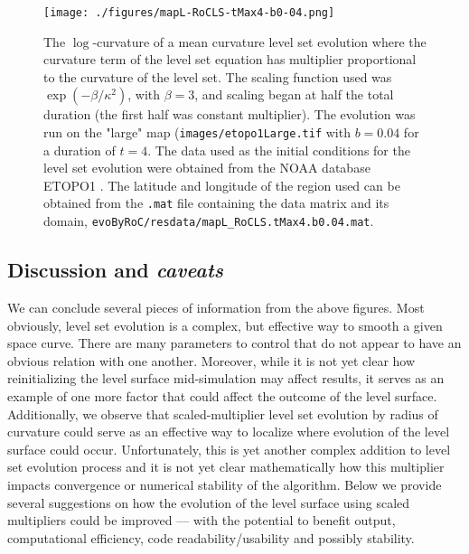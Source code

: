 \documentclass{article}
\begin{document}
\begin{figure}[h]
  \centering
  \texttt{[image: ./figures/mapL-RoCLS-tMax4-b0-04.png]}
  \caption{The $\log$-curvature of a mean curvature level set
    evolution where the curvature term of the level set equation
    has multiplier proportional to the curvature of the level
    set. The scaling function used was $\exp (-\beta/\kappa^2)$,
    with $\beta = 3$, and scaling began at half the total duration
    (the first half was constant multiplier). The evolution was
    run on the "large" map (\texttt{images/etopo1Large.tif} with
    $b = 0.04$ for a duration of $t = 4$. The data used as the
    initial conditions for the level set evolution were obtained
    from the NOAA database ETOPO1 \cite{etopo1}. The latitude and
    longitude of the region used can be obtained from the
    \texttt{.mat} file containing the data matrix and its domain,
    \texttt{evoByRoC/resdata/mapL\_RoCLS.tMax4.b0.04.mat}.}
\label{fig:scal-log-curv-3}
\end{figure}

\subsection{Discussion and \emph{caveats}}
\label{sec:emphcaveats}

We can conclude several pieces of information from the above
figures. Most obviously, level set evolution is a complex, but
effective way to smooth a given space curve. There are many
parameters to control that do not appear to have an obvious
relation with one another. Moreover, while it is not yet clear how
reinitializing the level surface mid-simulation may affect
results, it serves as an example of one more factor that could
affect the outcome of the level surface. Additionally, we observe
that scaled-multiplier level set evolution by radius of curvature
could serve as an effective way to localize where evolution of the
level surface could occur. Unfortunately, this is yet another
complex addition to level set evolution process and it is not yet
clear mathematically how this multiplier impacts convergence or
numerical stability of the algorithm. Below we provide several
suggestions on how the evolution of the level surface using scaled
multipliers could be improved --- with the potential to benefit
output, computational efficiency, code readability/usability and
possibly stability.
\end{document}

